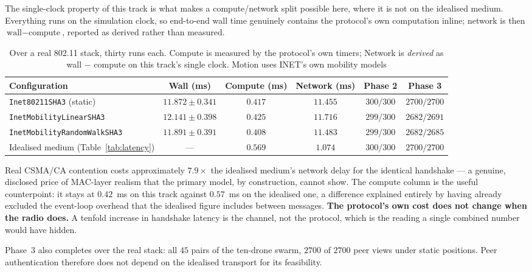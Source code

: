 \documentclass[11pt,a4paper]{article}
\begin{document}
The single-clock property of this track is what makes a compute/network split
possible here, where it is not on the idealised medium. Everything runs on the
simulation clock, so end-to-end wall time genuinely contains the protocol's own
computation inline; network is then
$\text{wall} - \text{compute}$, reported as derived rather than measured.

\begin{table}[H]
\centering
\caption{Over a real 802.11 stack, thirty runs each. Compute is measured by the
protocol's own timers; Network is \emph{derived} as wall $-$ compute on this
track's single clock. Motion uses INET's own mobility models}
\label{tab:inet}
\small
\begin{tabular}{@{}lccccc@{}}
\toprule
\textbf{Configuration} & \textbf{Wall (ms)} & \textbf{Compute (ms)} &
\textbf{Network (ms)} & \textbf{Phase 2} & \textbf{Phase 3} \\
\midrule
\texttt{Inet80211SHA3} (static)     & $11.872 \pm 0.341$ & $0.417$ & $11.455$ & $300/300$ & $2700/2700$ \\
\texttt{InetMobilityLinearSHA3}     & $12.141 \pm 0.398$ & $0.425$ & $11.716$ & $299/300$ & $2682/2691$ \\
\texttt{InetMobilityRandomWalkSHA3} & $11.891 \pm 0.391$ & $0.408$ & $11.483$ & $299/300$ & $2682/2685$ \\
\midrule
Idealised medium (Table~\ref{tab:latency}) & --- & $0.569$ & $1.074$ & $300/300$ & $2700/2700$ \\
\bottomrule
\end{tabular}
\end{table}

Real CSMA/CA contention costs approximately $7.9\times$ the idealised medium's
network delay for the identical handshake --- a genuine, disclosed price of
MAC-layer realism that the primary model, by construction, cannot show. The
compute column is the useful counterpoint: it stays at $0.42$~ms on this track
against $0.57$~ms on the idealised one, a difference explained entirely by
having already excluded the event-loop overhead that the idealised figure
includes between messages. \textbf{The protocol's own cost does not change when
the radio does.} A tenfold increase in handshake latency is the channel, not the
protocol, which is the reading a single combined number would have hidden.

Phase~3 also completes over the real stack: all $45$ pairs of the ten-drone
swarm, $2700$ of $2700$ peer views under static positions. Peer authentication
therefore does not depend on the idealised transport for its feasibility.
\end{document}
